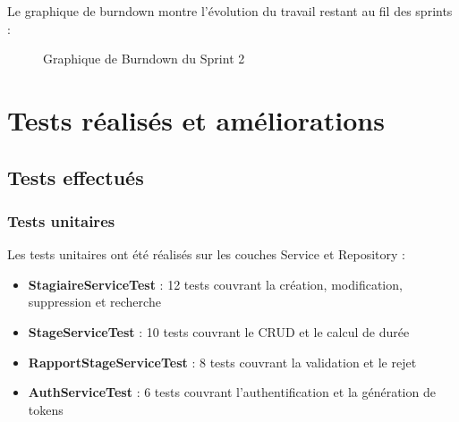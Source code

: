 \documentclass[12pt,a4paper]{report}
\begin{document}
Le graphique de burndown montre l'évolution du travail restant au fil des sprints :

\begin{figure}[H]
\centering
{}
\caption{Graphique de Burndown du Sprint 2}
\end{figure}

\section{Tests réalisés et améliorations}

\subsection{Tests effectués}

\subsubsection{Tests unitaires}

Les tests unitaires ont été réalisés sur les couches Service et Repository :

\begin{itemize}[leftmargin=1cm]
    \item \textbf{StagiaireServiceTest} : 12 tests couvrant la création, modification, suppression et recherche
    \item \textbf{StageServiceTest} : 10 tests couvrant le CRUD et le calcul de durée
    \item \textbf{RapportStageServiceTest} : 8 tests couvrant la validation et le rejet
    \item \textbf{AuthServiceTest} : 6 tests couvrant l'authentification et la génération de tokens
\end{itemize}
\end{document}
